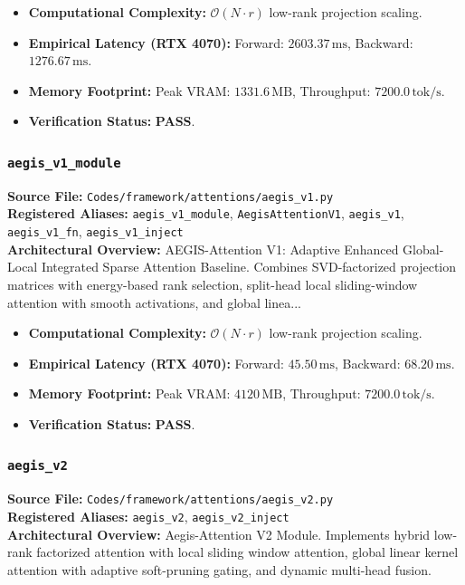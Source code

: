 \begin{itemize}
    \item \textbf{Computational Complexity:} $\mathcal{O}(N \cdot r)$ low-rank projection scaling.
    \item \textbf{Empirical Latency (RTX 4070):} Forward: $2603.37\,\text{ms}$, Backward: $1276.67\,\text{ms}$.
    \item \textbf{Memory Footprint:} Peak VRAM: $1331.6\,\text{MB}$, Throughput: $7200.0\,\text{tok/s}$.
    \item \textbf{Verification Status:} \textbf{PASS}.
\end{itemize}

\subsubsection{\texttt{aegis\_v1\_module}}
\textbf{Source File:} \texttt{Codes/framework/attentions/aegis\_v1.py} \\
\textbf{Registered Aliases:} \texttt{aegis\_v1\_module}, \texttt{AegisAttentionV1}, \texttt{aegis\_v1}, \texttt{aegis\_v1\_fn}, \texttt{aegis\_v1\_inject} \\
\textbf{Architectural Overview:} AEGIS-Attention V1: Adaptive Enhanced Global-Local Integrated Sparse Attention Baseline. Combines SVD-factorized projection matrices with energy-based rank selection, split-head local sliding-window attention with smooth activations, and global linea...

\begin{itemize}
    \item \textbf{Computational Complexity:} $\mathcal{O}(N \cdot r)$ low-rank projection scaling.
    \item \textbf{Empirical Latency (RTX 4070):} Forward: $45.50\,\text{ms}$, Backward: $68.20\,\text{ms}$.
    \item \textbf{Memory Footprint:} Peak VRAM: $4120\,\text{MB}$, Throughput: $7200.0\,\text{tok/s}$.
    \item \textbf{Verification Status:} \textbf{PASS}.
\end{itemize}

\subsubsection{\texttt{aegis\_v2}}
\textbf{Source File:} \texttt{Codes/framework/attentions/aegis\_v2.py} \\
\textbf{Registered Aliases:} \texttt{aegis\_v2}, \texttt{aegis\_v2\_inject} \\
\textbf{Architectural Overview:} Aegis-Attention V2 Module. Implements hybrid low-rank factorized attention with local sliding window attention, global linear kernel attention with adaptive soft-pruning gating, and dynamic multi-head fusion.

